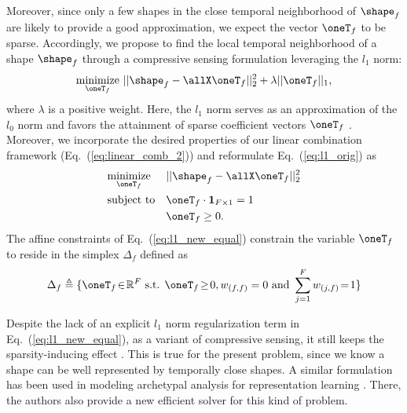 Moreover,
since only a few shapes in the close temporal neighborhood of $\shape_f$ are likely to provide a good approximation, we expect the vector $\oneT_f$ to be sparse.
Accordingly, we propose to find the local temporal neighborhood of a shape $\shape_f$ through a compressive sensing formulation leveraging the $l_1$ norm:
\begin{equation}
\underset{\oneT_f}{\text{minimize}} ~ ||\shape_f - \allX \oneT_f||_2^2 + \lambda||\oneT_f||_1,
\label{eq:l1_orig}
\end{equation}
where $\lambda$ is a positive weight. Here, the $l_1$ norm serves as an approximation of the $l_0$ norm and favors the attainment of sparse coefficient vectors $\oneT_f$ \cite{bach2012optimization}.
Moreover,  we incorporate the desired properties of our linear combination framework (Eq.~(\ref{eq:linear_comb_2})) and reformulate Eq.~(\ref{eq:l1_orig}) as
\begin{equation}
\begin{aligned}
& \underset{\oneT_f}{\text{minimize}} && ||\shape_f - \allX\oneT_f||_2^2 \\
& \text{subject to} && \oneT_f \cdot \mathbf 1_{F\times 1}= 1 \\
&                   && \oneT_f \geq 0.
\end{aligned}
\label{eq:l1_new_equal}
\end{equation}
The affine constraints of Eq.~(\ref{eq:l1_new_equal}) constrain the variable $\oneT_f$ to reside in the simplex $\Delta_f$ defined as
\begin{equation}
\Delta_f \triangleq \{ \oneT_f \! \in \! \mathbb{R}^F \text{ s.t. } \oneT_f \! \geq \! 0, w_{(f,f)}=0 \text{ and } \sum_{j=1}^{F} w_{(j,f)} \! = \! 1 \}
\end{equation}

Despite the lack of an explicit $l_1$ norm regularization term in
Eq.~(\ref{eq:l1_new_equal}), as a variant of compressive sensing, it still keeps the sparsity-inducing effect \cite{bach2012optimization,chen:hal-00995911}. This is true for the present problem, since we know a shape can be well represented by temporally close shapes. A similar formulation has been used in modeling archetypal analysis for representation learning \cite{chen:hal-00995911}. There, the authors also provide a new efficient solver for this kind of problem.

